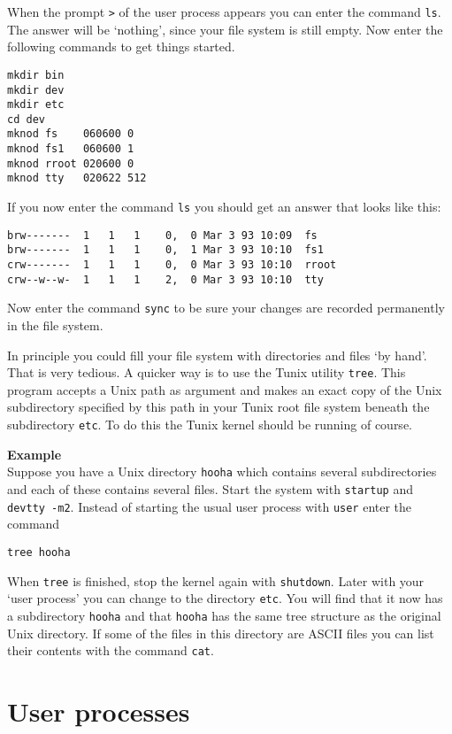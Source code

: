 When the prompt {\tt >} of the user process appears
you can enter the command {\tt ls}. The answer
will be `nothing', since your file system is
still empty. Now enter the following commands
to get things started.
\begin{verbatim}
mkdir bin
mkdir dev
mkdir etc
cd dev
mknod fs    060600 0
mknod fs1   060600 1
mknod rroot 020600 0
mknod tty   020622 512
\end{verbatim}
If you now enter the command {\tt ls} you should
get an answer that looks like this:
\begin{verbatim}
brw-------  1   1   1    0,  0 Mar 3 93 10:09  fs
brw-------  1   1   1    0,  1 Mar 3 93 10:10  fs1
crw-------  1   1   1    0,  0 Mar 3 93 10:10  rroot
crw--w--w-  1   1   1    2,  0 Mar 3 93 10:10  tty
\end{verbatim}
Now enter the command {\tt sync} to be sure your
changes are recorded permanently in the file system.


In principle you could fill your file system with
directories and files `by hand'. That is very
tedious. A quicker way is to use the Tunix
utility {\tt tree}. This program accepts a
Unix path as argument and makes an exact copy of
the Unix subdirectory specified by this path
in your Tunix root file system beneath the
subdirectory {\tt etc}. To do this the
Tunix kernel should be running of course.

\aaa
{\bf Example}\\
Suppose you have a Unix directory {\tt hooha}
which contains several subdirectories and each
of these contains several files. Start the
system with {\tt startup} and {\tt devtty -m2}.
Instead of starting the usual user process
with {\tt user} enter the command
\begin{verbatim}
tree hooha
\end{verbatim}
When {\tt tree} is finished, stop the kernel
again with {\tt shutdown}. Later with
your `user process' you can change
to the directory {\tt etc}. You will find
that it now has a subdirectory {\tt hooha}
and that {\tt hooha} has the same tree structure
as the original Unix directory. If some of
the files in this directory are ASCII files
you can list their contents with the command {\tt cat}.

\section{User processes}
\noindent

